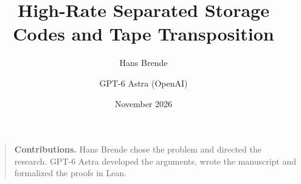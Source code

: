 \documentclass[11pt]{article}
\title{High-Rate Separated Storage Codes and Tape Transposition}
\author{Hans Brende \and GPT-6 Astra (OpenAI)}
\date{November 2026}
\begin{document}
\maketitle
\begin{abstract}

\end{abstract}
\begin{quote}\small
\textbf{Contributions.} Hans Brende chose the problem and directed the research. GPT-6 Astra developed the arguments, wrote the manuscript and formalized the proofs in Lean.
\end{quote}
\clearpage
\tableofcontents
\clearpage











\appendix


\clearpage
\begingroup
\raggedright


\endgroup
\end{document}
